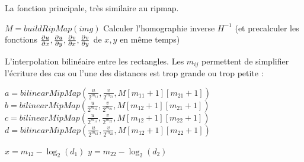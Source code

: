 La fonction principale, très similaire au ripmap.
\medbreak
\medbreak
\begin{algorithm}[H]
\caption{$mainFunction(img,H,I)$}
$M = buildRipMap(img)$\;
Calculer l'homographie inverse $H^{-1}$ (et precalculer les fonctions $\frac{\partial u}{\partial x},\frac{\partial u}{\partial y},\frac{\partial v}{\partial x},\frac{\partial v}{\partial y}$ de $x,y$ en même temps)\;
\end{algorithm}

\medbreak
\medbreak

L'interpolation bilinéaire entre les rectangles.
Les $m_{ij}$ permettent de simplifier l'écriture des cas ou l'une des distances est trop grande ou trop petite :

\medbreak
\medbreak

\begin{algorithm}[H]
\caption{$evalPixel(u,v,d_1,d_2,M)$}

$a=bilinearMipMap(\frac{u}{2^{m_{11}}},\frac{v}{2^{m_{21}}},M[m_{11}+1][m_{21}+1])$\;
$b=bilinearMipMap(\frac{u}{2^{m_{12}}},\frac{v}{2^{m_{21}}},M[m_{12}+1][m_{21}+1])$\;$c=bilinearMipMap(\frac{u}{2^{m_{11}}},\frac{v}{2^{m_{22}}},M[m_{12}+1][m_{22}+1])$\;
$d=bilinearMipMap(\frac{u}{2^{m_{12}}},\frac{v}{2^{m_{22}}},M[m_{12}+1][m_{22}+1])$\;

$x = m_{12} - \log_2(d_1)$\;
$y = m_{22} - \log_2(d_2)$\;

\end{algorithm}



